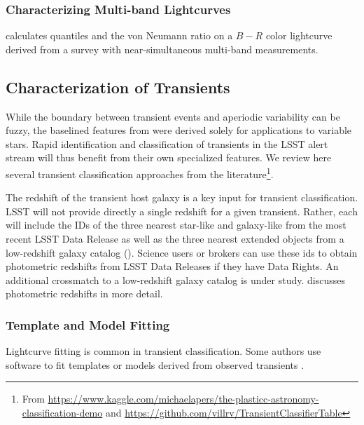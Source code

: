 \documentclass[DM,authoryear,toc]{lsstdoc}
\begin{document}
\subsubsection{Characterizing Multi-band Lightcurves}


\citet{Kim:14:The-EPOCH-Proje} calculates quantiles and the von Neumann ratio on a $B-R$ color lightcurve derived from a survey with near-simultaneous multi-band measurements.

\subsection{Characterization of Transients}

While the boundary between transient events and aperiodic variability can be fuzzy, the baselined features from \citet{2011ApJ...733...10R} were derived solely for applications to variable stars.
Rapid identification and classification of transients in the LSST alert stream will thus benefit from their own specialized features.
We review here several transient classification approaches from the literature\footnote{From \url{https://www.kaggle.com/michaelapers/the-plasticc-astronomy-classification-demo} and \url{https://github.com/villrv/TransientClassifierTable}}.

The redshift of the transient host galaxy is a key input for transient classification.
LSST will not provide directly a single redshift for a given transient.
Rather, each \DIAObject will include the IDs of the three nearest star-like and galaxy-like \Objects from the most recent LSST Data Release as well as the three nearest extended objects from a low-redshift galaxy catalog (\DPDD{}).
Science users or brokers can use these ids to obtain photometric redshifts from LSST Data Releases if they have Data Rights.
An additional crossmatch to a low-redshift galaxy catalog is under study.
 discusses photometric redshifts in more detail.

\subsubsection{Template and Model Fitting}

Lightcurve fitting is common in transient classification.
Some authors use software \citep[e.g.,][]{Jha:07:IaLCFitter,Kessler:09:SNANA,Sako:11:PSNid,Barbary:14:sncosmo,Guillochon:18:MOSFiT}
to fit templates or models derived from observed transients \citep[e.g.,][]{Nugent:02:IaTemplates,Guy:07:SALT2, Conley:08:SiFTO, Kessler:19:PlasticcModels, Vincenzi:19:CCTemplates}.
\end{document}
